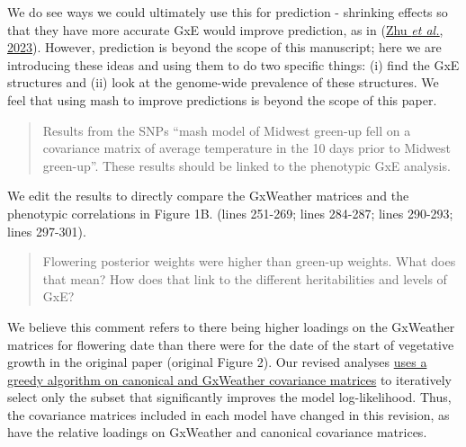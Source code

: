 \documentclass[
  letterpaper,
  DIV=11,
  numbers=noendperiod]{scrartcl}
\begin{document}
We do see ways we could ultimately use this for prediction - shrinking
effects so that they have more accurate GxE would improve prediction, as
in (\href{https://doi.org/10.1016/j.xgen.2023.100297}{Zhu \emph{et al.},
2023}). However, prediction is beyond the scope of this manuscript; here
we are introducing these ideas and using them to do two specific things:
(i) find the GxE structures and (ii) look at the genome-wide prevalence
of these structures. We feel that using mash to improve predictions is
beyond the scope of this paper.

\begin{quote}
\begin{tcolorbox}[enhanced jigsaw, rightrule=.15mm, colframe=quarto-callout-warning-color-frame, leftrule=.75mm, arc=.35mm, colback=white, opacityback=0, left=2mm, breakable, toprule=.15mm, bottomrule=.15mm]

Results from the SNPs ``mash model of Midwest green-up fell on a
covariance matrix of average temperature in the 10 days prior to Midwest
green-up''. These results should be linked to the phenotypic GxE
analysis.

\end{tcolorbox}
\end{quote}

We edit the results to directly compare the GxWeather matrices and the
phenotypic correlations in Figure 1B. (lines 251-269; lines 284-287;
lines 290-293; lines 297-301).

\begin{quote}
\begin{tcolorbox}[enhanced jigsaw, rightrule=.15mm, colframe=quarto-callout-warning-color-frame, leftrule=.75mm, arc=.35mm, colback=white, opacityback=0, left=2mm, breakable, toprule=.15mm, bottomrule=.15mm]

Flowering posterior weights were higher than green-up weights. What does
that mean? How does that link to the different heritabilities and levels
of GxE?

\end{tcolorbox}
\end{quote}

We believe this comment refers to there being higher loadings on the
GxWeather matrices for flowering date than there were for the date of
the start of vegetative growth in the original paper (original Figure
2). Our revised analyses \hyperref[fig-greedy]{uses a greedy algorithm
on canonical and GxWeather covariance matrices} to iteratively select
only the subset that significantly improves the model log-likelihood.
Thus, the covariance matrices included in each model have changed in
this revision, as have the relative loadings on GxWeather and canonical
covariance matrices.
\end{document}
